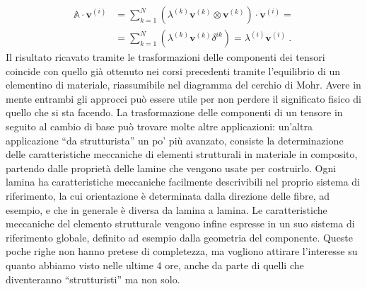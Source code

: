 {\begin{equation}
\begin{aligned}
    \mathbb{A} \cdot \bm{v}^{(i)} & =
    \sum_{k=1}^{N} \left( \lambda^{(k)} \bm{v}^{(k)} \otimes \bm{v}^{(k)} \right) \cdot \bm{v}^{(i)}  = \\
& = \sum_{k=1}^{N} \left( \lambda^{(k)} \bm{v}^{(k)} \delta^{ik}\right) = 
    \lambda^{(i)} \bm{v}^{(i)} \ .
\end{aligned}
\end{equation}
 }
  Il risultato ricavato tramite le trasformazioni delle componenti dei tensori coincide con quello  già ottenuto nei corsi precedenti tramite l'equilibrio di un elementino di materiale, riassumibile nel diagramma del cerchio di Mohr. Avere in mente entrambi gli approcci può essere utile per non perdere il significato fisico di quello che si sta facendo.
%
\newline \noindent 
 La trasformazione delle componenti di un tensore in seguito al cambio di base può trovare molte altre applicazioni: un'altra applicazione ``da strutturista'' un po' più avanzato, consiste la determinazione delle caratteristiche meccaniche di elementi strutturali in materiale in composito, partendo dalle proprietà delle lamine che vengono usate per costruirlo.
 Ogni lamina ha caratteristiche meccaniche facilmente descrivibili nel proprio sistema di riferimento, la cui orientazione è determinata dalla direzione delle fibre, ad esempio, e che in generale è diversa da lamina a lamina. Le caratteristiche meccaniche del elemento strutturale vengono infine espresse in un suo sistema di riferimento globale, definito ad esempio dalla geometria del componente. 
%
\newline \noindent 
 Queste poche righe non hanno pretese di completezza, ma vogliono attirare l'interesse su quanto abbiamo visto nelle ultime 4 ore,
  anche da parte di quelli che diventeranno ``strutturisti'' ma non solo.
%
\clearpage \newpage
